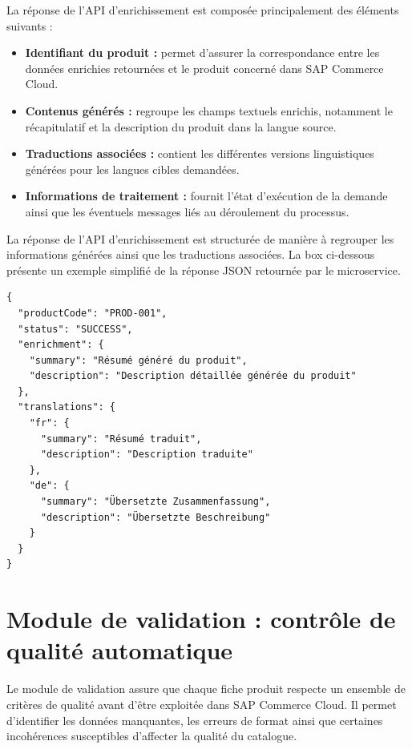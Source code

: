 La réponse de l'API d'enrichissement est composée principalement des éléments suivants :

\begin{itemize}
    \item \textbf{Identifiant du produit :} permet d'assurer la correspondance entre les données enrichies retournées et le produit concerné dans SAP Commerce Cloud.
    \item \textbf{Contenus générés :} regroupe les champs textuels enrichis, notamment le récapitulatif et la description du produit dans la langue source.
    \item \textbf{Traductions associées :} contient les différentes versions linguistiques générées pour les langues cibles demandées.
    \item \textbf{Informations de traitement :} fournit l'état d'exécution de la demande ainsi que les éventuels messages liés au déroulement du processus.
\end{itemize}

La réponse de l'API d'enrichissement est structurée de manière à regrouper les informations générées ainsi que les traductions associées. La box ci-dessous présente un exemple simplifié de la réponse JSON retournée par le microservice.

\begin{tcolorbox}[
    colback=white,
    colframe=black,
    boxrule=0.8pt,
    arc=2mm,
    title=Exemple de réponse JSON de l'API d'enrichissement,
    fonttitle=\bfseries
]
\begin{verbatim}
{
  "productCode": "PROD-001",
  "status": "SUCCESS",
  "enrichment": {
    "summary": "Résumé généré du produit",
    "description": "Description détaillée générée du produit"
  },
  "translations": {
    "fr": {
      "summary": "Résumé traduit",
      "description": "Description traduite"
    },
    "de": {
      "summary": "Übersetzte Zusammenfassung",
      "description": "Übersetzte Beschreibung"
    }
  }
}
\end{verbatim}
\end{tcolorbox}

\section{Module de validation : contrôle de qualité automatique}

Le module de validation assure que chaque fiche produit respecte un ensemble de critères de qualité avant d'être exploitée dans SAP Commerce Cloud. Il permet d'identifier les données manquantes, les erreurs de format ainsi que certaines incohérences susceptibles d'affecter la qualité du catalogue.

